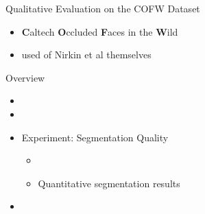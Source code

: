 \documentclass{beamer}
\begin{document}
\begin{frame}[c]{Qualitative Evaluation on the COFW Dataset}
	\begin{itemize}
		\item \textbf{C}altech \textbf{O}ccluded \textbf{F}aces in the \textbf{W}ild
		\item used of Nirkin et al themselves
	\end{itemize}
	\begin{figure}
		\centering
		\quad
	\end{figure}
\end{frame}

\begin{frame}[c]{Overview}
	\begin{itemize}
		\item {}
		\item {}
		\item Experiment: Segmentation Quality
		\begin{itemize}
			\item {}
			\item Quantitative segmentation results
		\end{itemize}
		\item {}
	\end{itemize}
\end{frame}
\end{document}
